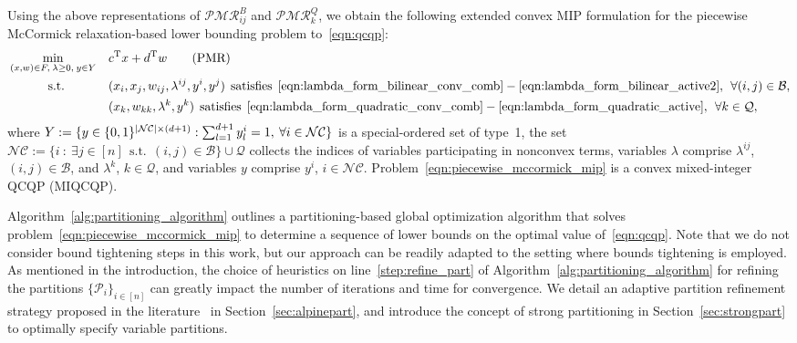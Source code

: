 \documentclass{article}
\newcommand{\pmc}{piecewise McCormick}
\DeclarePairedDelimiter\abs{\lvert}{\rvert}%
\begin{document}
Using the above representations of $\mathcal{PMR}^B_{ij}$ and $\mathcal{PMR}^Q_{k}$, we obtain the following extended convex MIP formulation for the {\pmc} relaxation-based lower bounding problem to~\eqref{eqn:qcqp}:
\begin{alignat}{2}
\label{eqn:piecewise_mccormick_mip}
&\min_{(x,w) \in F, \:\lambda \geq 0, \: y \in Y} && c^{\textup{T}} x + d^{\textup{T}} w \tag{PMR}\\
&\qquad\quad\: \text{s.t.} && (x_i, x_j, w_{ij}, \lambda^{ij}, y^i, y^j) \:\: \text{satisfies} \:\: \eqref{eqn:lambda_form_bilinear_conv_comb}-\eqref{eqn:lambda_form_bilinear_active2}, \:\: \forall (i,j) \in \mathcal{B}, \nonumber\\
& && (x_k, w_{kk}, \lambda^k, y^k) \:\: \text{satisfies} \:\: \eqref{eqn:lambda_form_quadratic_conv_comb}-\eqref{eqn:lambda_form_quadratic_active}, \:\: \forall k \in \mathcal{Q}, \nonumber
\end{alignat}
where $Y := \{y \in \{0,1\}^{\abs{\mathcal{NC}} \times (d+1)} : \sum_{l=1}^{d+1} y^{i}_l = 1, \: \forall i \in \mathcal{NC} \}$ is a special-ordered set of type~1, the set $\mathcal{NC} := \{i \: : \: \exists j \in [n] \:\: \text{s.t.} \:\: (i,j) \in \mathcal{B}\} \cup \mathcal{Q}$ collects the indices of variables participating in nonconvex terms, variables $\lambda$ comprise $\lambda^{ij}$, $(i,j) \in \mathcal{B}$, and $\lambda^k$, $k \in \mathcal{Q}$, and variables $y$ comprise $y^i$, $i \in \mathcal{NC}$.
Problem~\eqref{eqn:piecewise_mccormick_mip} is a convex mixed-integer QCQP (MIQCQP).









Algorithm~\ref{alg:partitioning_algorithm} outlines a partitioning-based global optimization algorithm that solves problem~\eqref{eqn:piecewise_mccormick_mip} to determine a sequence of lower bounds on the optimal value of~\eqref{eqn:qcqp}.
Note that we do not consider bound tightening steps in this work, but our approach can be readily adapted to the setting where bounds tightening is employed.
As mentioned in the introduction, the choice of heuristics on line~\ref{step:refine_part} of Algorithm~\ref{alg:partitioning_algorithm} for refining the partitions $\{\mathcal{P}_i\}_{i \in [n]}$ can greatly impact the number of iterations and time for convergence.
We detail an adaptive partition refinement strategy proposed in the literature~\cite{nagarajan2019adaptive} in Section~\ref{sec:alpinepart}, and introduce the concept of strong partitioning in Section~\ref{sec:strongpart} to optimally specify variable partitions.
\end{document}
